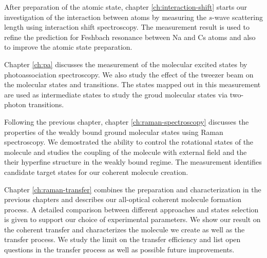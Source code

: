 After preparation of the atomic state,
chapter \ref{ch:interaction-shift} starts our investigation of the interaction between atoms
by measuring the $s$-wave scattering length using interaction shift spectroscopy.
The measurement result is used to refine the prediction for Feshbach resonance
between Na and Cs atoms and also to improve the atomic state preparation.

Chapter \ref{ch:pa} discusses the measurement of the molecular excited states
by photoassociation spectroscopy.
We also study the effect of the tweezer beam on the molecular states and transitions.
The states mapped out in this measurement are used as intermediate states
to study the groud molecular states via two-photon transitions.

Following the previous chapter, chapter \ref{ch:raman-spectroscopy} discusses
the properties of the weakly bound ground molecular states using Raman spectroscopy.
We demostrated the ability to control the rotational states of the molecule
and studies the coupling of the molecule with external field
and the their hyperfine structure in the weakly bound regime.
The measurement identifies candidate target states for our coherent molecule creation.

Chapter \ref{ch:raman-transfer} combines the preparation and characterization
in the previous chapters and describes our all-optical coherent molecule formation process.
A detailed comparison between different approaches and states selection is given
to support our choice of experimental parameters.
We show our result on the coherent transfer and characterizes
the molecule we create as well as the transfer process.
We study the limit on the transfer efficiency
and list open questions in the transfer process
as well as possible future improvements.
